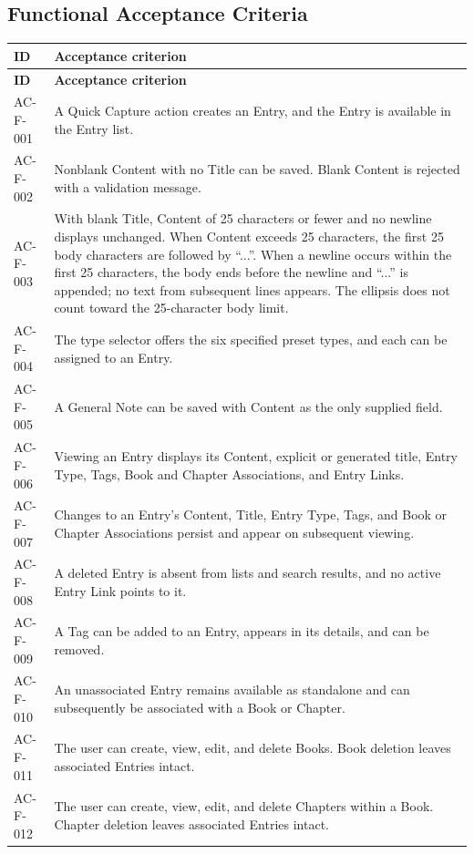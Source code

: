 \documentclass[11pt,a4paper]{article}
\begin{document}
\subsection{Functional Acceptance Criteria}
\begin{longtable}{|L{2.4cm}|L{13.6cm}|}
\hline \textbf{ID} & \textbf{Acceptance criterion} \\
\hline
\endfirsthead
\hline \textbf{ID} & \textbf{Acceptance criterion} \\
\hline
\endhead
AC-F-001 & A Quick Capture action creates an Entry, and the Entry is available in the Entry list. \\ \hline
AC-F-002 & Nonblank Content with no Title can be saved. Blank Content is rejected with a validation message. \\ \hline
AC-F-003 & With blank Title, Content of 25 characters or fewer and no newline displays unchanged. When Content exceeds 25 characters, the first 25 body characters are followed by ``...''. When a newline occurs within the first 25 characters, the body ends before the newline and ``...'' is appended; no text from subsequent lines appears. The ellipsis does not count toward the 25-character body limit. \\ \hline
AC-F-004 & The type selector offers the six specified preset types, and each can be assigned to an Entry. \\ \hline
AC-F-005 & A General Note can be saved with Content as the only supplied field. \\ \hline
AC-F-006 & Viewing an Entry displays its Content, explicit or generated title, Entry Type, Tags, Book and Chapter Associations, and Entry Links. \\ \hline
AC-F-007 & Changes to an Entry's Content, Title, Entry Type, Tags, and Book or Chapter Associations persist and appear on subsequent viewing. \\ \hline
AC-F-008 & A deleted Entry is absent from lists and search results, and no active Entry Link points to it. \\ \hline
AC-F-009 & A Tag can be added to an Entry, appears in its details, and can be removed. \\ \hline
AC-F-010 & An unassociated Entry remains available as standalone and can subsequently be associated with a Book or Chapter. \\ \hline
AC-F-011 & The user can create, view, edit, and delete Books. Book deletion leaves associated Entries intact. \\ \hline
AC-F-012 & The user can create, view, edit, and delete Chapters within a Book. Chapter deletion leaves associated Entries intact. \\ \hline

\end{longtable}
\end{document}
